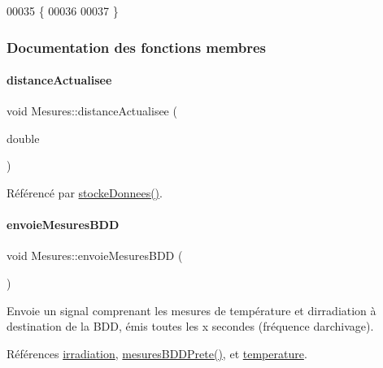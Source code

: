 \begin{DoxyCode}
00035 \{
00036 
00037 \}
\end{DoxyCode}


\subsubsection{Documentation des fonctions membres}
\mbox{\label{class_mesures_a6073f147fb08d7c5cc2ce1c9880becbe}} 
\paragraph{\texorpdfstring{distance\+Actualisee}{distanceActualisee}}
{\footnotesize\ttfamily void Mesures\+::distance\+Actualisee (\begin{DoxyParamCaption}\item[{double}]{ }\end{DoxyParamCaption})\hspace{0.3cm}{\ttfamily [signal]}}



Référencé par \hyperlink{class_mesures_a77652c2332a9234bf08b463d1d389aa5}{stocke\+Donnees()}.

\mbox{\label{class_mesures_a9eb8d49c9f60b3801110a5c3d0c50149}} 
\paragraph{\texorpdfstring{envoie\+Mesures\+B\+DD}{envoieMesuresBDD}}
{\footnotesize\ttfamily void Mesures\+::envoie\+Mesures\+B\+DD (\begin{DoxyParamCaption}{ }\end{DoxyParamCaption})\hspace{0.3cm}{\ttfamily [slot]}}

Envoie un signal comprenant les mesures de température et d\textquotesingle{}irradiation à destination de la B\+DD, émis toutes les x secondes (fréquence d\textquotesingle{}archivage). 

Références \hyperlink{class_mesures_a77cde7672dac5e544b7288364ec7c7b5}{irradiation}, \hyperlink{class_mesures_a97d8dbd7742519d1f3ce959661d8aede}{mesures\+B\+D\+D\+Prete()}, et \hyperlink{class_mesures_a2688d0da4acf9d91ea0befd6ed0bd140}{temperature}.




